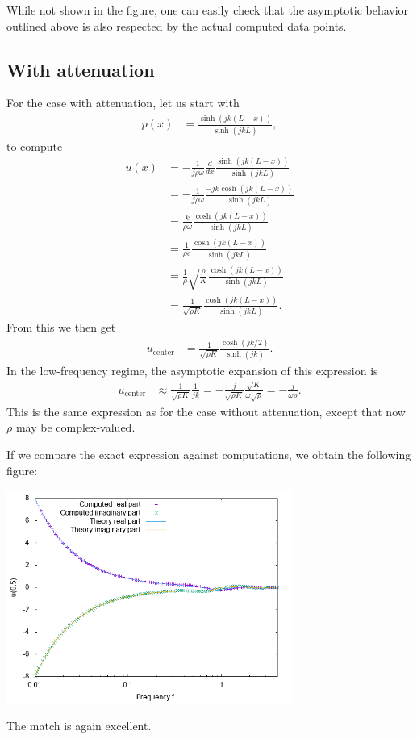 \documentclass{article}
\begin{document}
While not shown
in the figure, one can easily check that the asymptotic behavior
outlined above is also respected by the actual computed data points.



\subsection{With attenuation}

For the case with attenuation, let us start with
\begin{align*}
  p(x)
  &=
  \frac{\sinh(jk(L-x))}{\sinh(jkL)},
\end{align*}
to compute
\begin{align*}
  u(x)
  &=
  -\frac{1}{j\rho\omega} \frac{d}{dx}
  \frac{\sinh(jk(L-x))}{\sinh(jkL)}
  \\
  &=
  -\frac{1}{j\rho\omega}
  \frac{-jk\cosh(jk(L-x))}{\sinh(jkL)}
  \\
  &=
  \frac{k}{\rho\omega}
  \frac{\cosh(jk(L-x))}{\sinh(jkL)}
  \\
  &=
  \frac{1}{\rho c}
  \frac{\cosh(jk(L-x))}{\sinh(jkL)}
  \\
  &=
  \frac{1}{\rho}\sqrt{\frac{\rho}{K}}
  \frac{\cosh(jk(L-x))}{\sinh(jkL)}
  \\
  &=
  \frac{1}{\sqrt{\rho K}}
  \frac{\cosh(jk(L-x))}{\sinh(jkL)}.
\end{align*}
From this we then get
\begin{align*}
  u_\text{center}
  &=
  \frac{1}{\sqrt{\rho K}}
  \frac{\cosh(jk/2)}{\sinh(jk)}.
\end{align*}
In the low-frequency regime, the asymptotic expansion of this
expression is
\begin{align*}
  u_\text{center}
  &\approx
  \frac{1}{\sqrt{\rho K}}
  \frac{1}{jk}
  =
  -\frac{j}{\sqrt{\rho K}}
  \frac{\sqrt{K}}{\omega\sqrt{\rho}}
  =
  -\frac{j}{\omega\rho}.
\end{align*}
This is the same expression as for the case without attenuation,
except that now $\rho$ may be complex-valued.

If we compare the exact expression against computations, we obtain the
following figure:
\begin{center}
\includegraphics[width=0.7\textwidth]{with-attenuation/velocity-at-center.png}
\end{center}
The match is again excellent.
\end{document}
